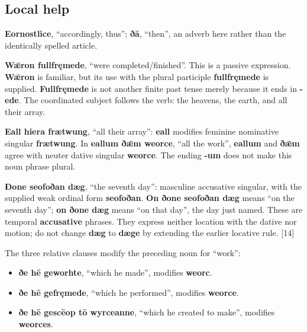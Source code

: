 \subsection*{Local help}

\textbf{Eornostlice}, “accordingly, thus”; \textbf{ðā}, “then”, an adverb here rather than the identically spelled article.

\textbf{Wǣron fullfręmede}, “were completed/\allowbreak{}finished”. This is a passive expression. \textbf{Wǣron} is familiar, but its use with the plural participle \textbf{fullfręmede} is supplied. \textbf{Fullfręmede} is not another finite past tense merely because it ends in \textbf{-ede}. The coordinated subject follows the verb: the heavens, the earth, and all their array.

\textbf{Eall hiera frætwung}, “all their array”: \textbf{eall} modifies feminine nominative singular \textbf{frætwung}. In \textbf{eallum ðǣm weorce}, “all the work”, \textbf{eallum} and \textbf{ðǣm} agree with neuter dative singular \textbf{weorce}. The ending \textbf{-um} does not make this noun phrase plural.

\textbf{Ðone seofoðan dæg}, “the seventh day”: masculine accusative singular, with the supplied weak ordinal form \textbf{seofoðan}. \textbf{On ðone seofoðan dæg} means “on the seventh day”; \textbf{on ðone dæg} means “on that day”, the day just named. These are temporal \textbf{accusative} phrases. They express neither location with the dative nor motion; do not change \textbf{dæg} to \textbf{dæge} by extending the earlier locative rule. [14]

The three relative clauses modify the preceding noun for “work”:

\begin{itemize}
\item \textbf{ðe hē geworhte}, “which he made”, modifies \textbf{weorc}.
\item \textbf{ðe hē gefręmede}, “which he performed”, modifies \textbf{weorce}.
\item \textbf{ðe hē gescēop tō wyrceanne}, “which he created to make”, modifies \textbf{weorces}.
\end{itemize}

